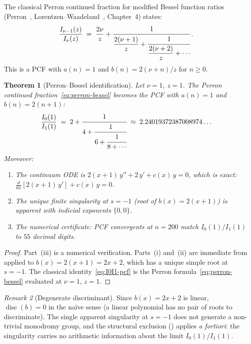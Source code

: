 \documentclass[11pt,a4paper]{amsart}
\theoremstyle{plain}
\newtheorem{theorem}{Theorem}[section]
\theoremstyle{definition}
\theoremstyle{remark}
\newtheorem{remark}[theorem]{Remark}
\newcommand{\disc}{\operatorname{disc}}
\begin{document}
The classical Perron continued fraction for modified Bessel function
ratios (Perron~\cite{Perron57}, Lorentzen--Waadeland~\cite{LW92},
Chapter~4) states:
\begin{equation}\label{eq:perron-bessel}
  \frac{I_{\nu-1}(z)}{I_\nu(z)}
  \;=\; \frac{2\nu}{z}
  + \cfrac{1}{\dfrac{2(\nu+1)}{z}
  + \cfrac{1}{\dfrac{2(\nu+2)}{z} + \cdots}}\,.
\end{equation}
This is a PCF with $a(n)=1$ and $b(n) = 2(\nu+n)/z$ for $n\ge 0$.

\begin{theorem}[Perron--Bessel identification]\label{thm:perron-bessel}
Let $\nu = 1$, $z = 1$.  The Perron continued
fraction~\eqref{eq:perron-bessel} becomes the PCF
with $a(n)=1$ and $b(n) = 2(n+1)$:
\begin{equation}\label{eq:I0I1-pcf}
  \frac{I_0(1)}{I_1(1)}
  \;=\; 2 + \cfrac{1}{4 + \cfrac{1}{6 + \cfrac{1}{8 + \cdots}}}
  \;\approx\; 2.24019372387008974\ldots
\end{equation}
Moreover:
\begin{enumerate}[label=(\roman*)]
\item The continuum ODE is
  $2(x+1)\,y'' + 2\,y' + c(x)\,y = 0$, which is exact:
  $\tfrac{d}{dx}[2(x+1)\,y'] + c(x)\,y = 0$.
\item The unique finite singularity at $s = -1$ (root of $b(x)=2(x+1)$)
  is apparent with indicial exponents $\{0,0\}$.
\item The numerical certificate: PCF convergents at $n=200$ match
  $I_0(1)/I_1(1)$ to $55$ decimal digits.
\end{enumerate}
\end{theorem}

\begin{proof}
Part~(iii) is a numerical verification.  Parts~(i) and~(ii) are
immediate from  applied to
$b(x) = 2(x+1) = 2x+2$, which has a unique simple root at $s=-1$.
The classical identity~\eqref{eq:I0I1-pcf} is the Perron
formula~\eqref{eq:perron-bessel} evaluated at $\nu=1$, $z=1$.
\end{proof}

\begin{remark}[Degenerate discriminant]
Since $b(x) = 2x+2$ is linear, $\disc(b) = 0$ in the na\"ive sense
(a linear polynomial has no pair of roots to discriminate).
The single apparent singularity at $s = -1$ does not generate a
non-trivial monodromy group, and the structural exclusion
() applies \emph{a fortiori}: the singularity
carries no arithmetic information about the limit $I_0(1)/I_1(1)$.
\end{remark}
\end{document}
